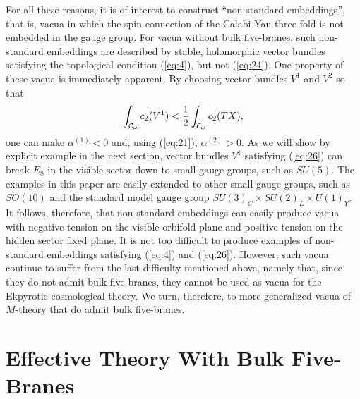 \documentclass[a4paper,12pt]{article}
\numberwithin{equation}{section}
\theoremstyle{plain}
\begin{document}
For all these reasons, it is of interest to construct ``non-standard
embeddings'', that is, vacua in which the spin connection of the Calabi-Yau 
three-fold is not embedded in the gauge group. For vacua without bulk
five-branes, such non-standard embeddings are described by stable, holomorphic
vector bundles satisfying the topological condition (\ref{eq:4}), but not
(\ref{eq:24}). One property of these vacua is immediately apparent. By
choosing vector bundles $V^{1}$ and $V^{2}$ so that
%
\begin{equation}
\int_{{\cal{C}}_{\omega}}{c_{2}(V^{1})} < \frac{1}{2}\int_{{\cal{C}}_{\omega}}
{c_{2}(TX)},
\label{eq:26}
\end{equation}
%
one can make $\alpha^{(1)}<0$ and, using (\ref{eq:21}), $\alpha^{(2)}>0$. As we
will show by explicit example in the next section, vector bundles
$V^{1}$ satisfying (\ref{eq:26}) can break $E_{8}$ in the visible sector 
down to small gauge groups, such as $SU(5)$. The examples in this paper are
easily extended to other small gauge groups, such as $SO(10)$ and the standard model 
gauge group $SU(3)_{C} \times SU(2)_{L} \times U(1)_{Y}$. It follows,
therefore, that non-standard embeddings can easily produce vacua with negative
tension on the visible orbifold plane and positive tension on the hidden
sector fixed plane. It is not too difficult to produce examples of
non-standard embeddings satisfying (\ref{eq:4}) and (\ref{eq:26}). However,
such vacua continue to suffer from the last difficulty mentioned above, namely
that, since they do not  admit bulk five-branes, they cannot be
used as vacua for the Ekpyrotic cosmological theory. We turn, therefore, to
more generalized vacua of $M$-theory that do admit bulk five-branes.



\section{Effective Theory With Bulk Five-Branes}
\end{document}
